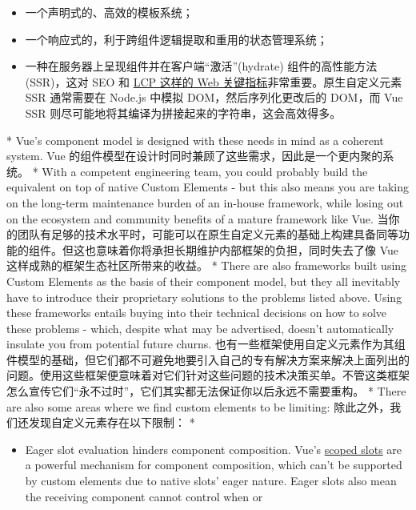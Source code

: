 \begin{paracol}{2}
\begin{itemize}
\item
  一个声明式的、高效的模板系统；
\item
  一个响应式的，利于跨组件逻辑提取和重用的状态管理系统；
\item
  一种在服务器上呈现组件并在客户端``激活''(hydrate) 组件的高性能方法
  (SSR)，这对 SEO 和 \href{https://web.dev/vitals/}{LCP 这样的 Web
  关键指标}非常重要。原生自定义元素 SSR 通常需要在 Node.js 中模拟
  DOM，然后序列化更改后的 DOM，而 Vue SSR
  则尽可能地将其编译为拼接起来的字符串，这会高效得多。
\end{itemize}
\switchcolumn[0]*%
Vue's component model is designed with these needs in mind as a coherent
system.
\switchcolumn
Vue 的组件模型在设计时同时兼顾了这些需求，因此是一个更内聚的系统。
\switchcolumn[0]*%
With a competent engineering team, you could probably build the
equivalent on top of native Custom Elements - but this also means you
are taking on the long-term maintenance burden of an in-house framework,
while losing out on the ecosystem and community benefits of a mature
framework like Vue.
\switchcolumn
当你的团队有足够的技术水平时，可能可以在原生自定义元素的基础上构建具备同等功能的组件。但这也意味着你将承担长期维护内部框架的负担，同时失去了像
Vue 这样成熟的框架生态社区所带来的收益。
\switchcolumn[0]*%
There are also frameworks built using Custom Elements as the basis of
their component model, but they all inevitably have to introduce their
proprietary solutions to the problems listed above. Using these
frameworks entails buying into their technical decisions on how to solve
these problems - which, despite what may be advertised, doesn't
automatically insulate you from potential future churns.
\switchcolumn
也有一些框架使用自定义元素作为其组件模型的基础，但它们都不可避免地要引入自己的专有解决方案来解决上面列出的问题。使用这些框架便意味着对它们针对这些问题的技术决策买单。不管这类框架怎么宣传它们``永不过时''，它们其实都无法保证你以后永远不需要重构。
\switchcolumn[0]*%
There are also some areas where we find custom elements to be limiting:
\switchcolumn
除此之外，我们还发现自定义元素存在以下限制：
\switchcolumn[0]*%
\begin{itemize}
\item
  Eager slot evaluation hinders component composition. Vue's
  \href{https://vuejs.org/guide/components/slots.html\#scoped-slots}{scoped
  slots} are a powerful mechanism for component composition, which can't
  be supported by custom elements due to native slots' eager nature.
  Eager slots also mean the receiving component cannot control when or

\end{itemize}
\end{paracol}
